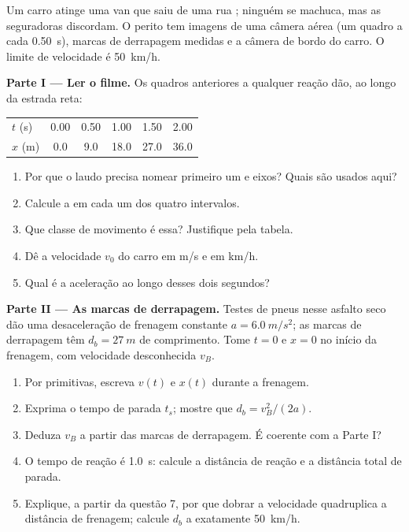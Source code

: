 \begin{problem}
\label{pb:g12:kinematics-2d:1}
Um carro atinge uma van que saiu de uma rua ; ninguém se
machuca, mas as seguradoras discordam. O perito tem imagens de uma câmera
aérea (um quadro a cada \qty{0.50}{s}), marcas de derrapagem medidas e a
câmera de bordo do carro. O limite de velocidade é \qty{50}{km/h}.

\medskip
\noindent\textbf{Parte I --- Ler o filme.}
Os quadros anteriores a qualquer reação dão, ao longo da estrada reta:
\begin{center}\small
\begin{tabular}{lccccc}
$t$ (\unit{s}) & 0.00 & 0.50 & 1.00 & 1.50 & 2.00\\
$x$ (\unit{m}) & 0.0 & 9.0 & 18.0 & 27.0 & 36.0
\end{tabular}
\end{center}
\begin{enumerate}
  \item Por que o laudo precisa nomear primeiro um  e eixos?
        Quais são usados aqui?
  \item Calcule a  em cada um dos quatro intervalos.
  \item Que classe de movimento é essa? Justifique pela tabela.
  \item Dê a velocidade $v_0$ do carro em \unit{m/s} e em \unit{km/h}.
  \item Qual é a aceleração ao longo desses dois segundos?
\end{enumerate}

\medskip
\noindent\textbf{Parte II --- As marcas de derrapagem.}
Testes de pneus nesse asfalto seco dão uma desaceleração de frenagem
constante $a = \qty{6.0}{m/s^2}$; as marcas de derrapagem têm
$d_b = \qty{27}{m}$ de comprimento. Tome $t = 0$ e $x = 0$ no início da
frenagem, com velocidade desconhecida $v_B$.
\begin{enumerate}[resume]
  \item Por primitivas, escreva $v(t)$ e $x(t)$ durante a frenagem.
  \item Exprima o tempo de parada $t_s$; mostre que $d_b = v_B^2/(2a)$.
  \item Deduza $v_B$ a partir das marcas de derrapagem. É coerente com a
        Parte I?
  \item O tempo de reação é \qty{1.0}{s}: calcule a distância de reação e
        a distância total de parada.
  \item Explique, a partir da questão 7, por que dobrar a velocidade
        quadruplica a distância de frenagem; calcule $d_b$ a exatamente
        \qty{50}{km/h}.
\end{enumerate}


\end{problem}

